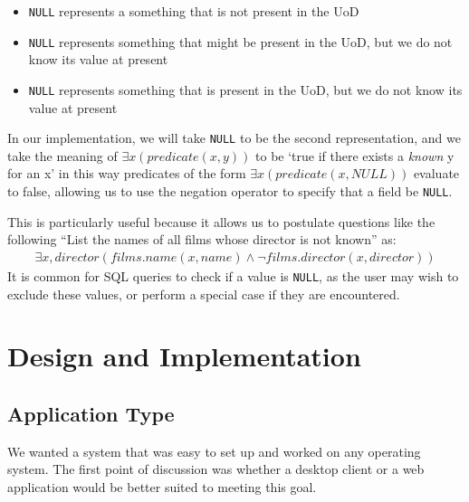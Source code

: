 \documentclass[a4paper, 11pt]{article}
\begin{document}
      \begin{itemize}
        \item \texttt{NULL} represents a something that is not present in the
          UoD
        \item \texttt{NULL} represents something that might be present in the
          UoD, but we do not know its value at present
        \item \texttt{NULL} represents something that is present in the UoD, but
          we do not know its value at present
      \end{itemize}

      In our implementation, we will take \texttt{NULL} to be the second
      representation, and we take the meaning of $\exists x (predicate(x,y))$ to
      be `true if there exists a \emph{known} y for an x' in this way predicates
      of the form $\exists x (predicate(x,NULL))$ evaluate to false, allowing us
      to use the negation operator to specify that a field be \texttt{NULL}.

      This is particularly useful because it allows us to postulate questions
      like the following ``List the names of all films whose director is not
      known'' as:
      \begin{gather}
        \exists x,director(films.name(x,name) \land \lnot
          films.director(x, director) )
      \end{gather}
      It is common for SQL queries to check if a value is \texttt{NULL}, as the
      user may wish to exclude these values, or perform a special case if they
      are encountered.

\section{Design and Implementation}
  \subsection{Application Type}
    We wanted a system that was easy to set up and worked on any operating
    system. The first point of discussion was whether a desktop client or a web
    application would be better suited to meeting this goal.
\end{document}
